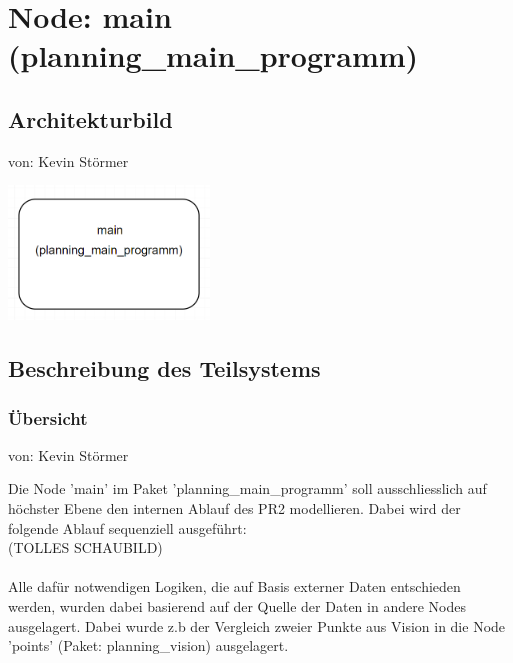 \documentclass{suturo}
\begin{document}

\makeatletter
\newcommand{\chapterauthor}[1]{%
  {\parindent0pt\vspace*{-27pt}%
  \linespread{0}\small\begin{flushright}von: #1\end{flushright}%
  \par\nobreak\vspace*{0pt}}
  \@afterheading%
}
\makeatother

\section{Node: main (planning\_main\_programm)}
\subsection{Architekturbild}
\chapterauthor{Kevin Störmer}
\begin{center} \includegraphics[width=0.4\textwidth]{img/diag_planning_main_programm.png} \end{center}
\subsection{Beschreibung des Teilsystems}
\subsubsection{\"Ubersicht}
\chapterauthor{Kevin Störmer}
Die Node 'main' im Paket 'planning\_main\_programm' soll ausschliesslich auf höchster Ebene den internen Ablauf des PR2 modellieren. Dabei wird der folgende Ablauf sequenziell ausgef\"uhrt:\\
(TOLLES SCHAUBILD)\\ \\
Alle dafür notwendigen Logiken, die auf Basis externer Daten entschieden werden, wurden dabei basierend auf der Quelle der Daten in andere Nodes ausgelagert. Dabei wurde z.b der Vergleich zweier Punkte aus Vision in die Node 'points' (Paket: planning\_vision) ausgelagert.
\end{document}
